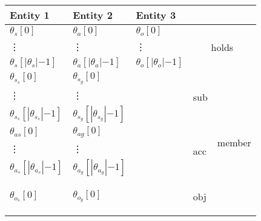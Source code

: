 \documentclass[10pt, twocolumn]{article}
\begin{document}
          \begin{tabular}[t]{|l|l|l|l|l|}
            \hline
            \textbf{Entity 1} &
            \textbf{Entity 2} &
            \textbf{Entity 3} &
            \multicolumn{2}{|l|}{\textbf{}} \\
            \hline
            ${\theta}_{s}[0]$ &
            ${\theta}_{a}[0]$ &
            ${\theta}_{o}[0]$ &
            \multicolumn{2}{|c|}{\multirow{3}{*}{\begin{sideways}holds\end{sideways}}} \\
            \vdots & \vdots & \vdots & \multicolumn{2}{|c|}{} \\
            ${\theta}_{s}[|{\theta}_{s}|{-1}]$ &
            ${\theta}_{a}[|{\theta}_{a}|{-1}]$ &
            ${\theta}_{o}[|{\theta}_{o}|{-1}]$ &
            \multicolumn{2}{|c|}{} \\
            \hline
            ${\theta}_{s_s}[0]$ &
            ${\theta}_{s_g}[0]$ &
            &
            \multirow{3}{*}{\begin{sideways}sub\end{sideways}} &
            \multirow{9}{*}{\begin{sideways}member\end{sideways}} \\
            \vdots & \vdots & & & \\
            ${\theta}_{s_s}[|{\theta}_{s_s}|{-1}]$ & ${\theta}_{s_g}[|{\theta}_{s_g}|{-1}]$ & & & \\
            \cline{1-4}
            ${\theta}_{as}[0]$ &
            ${\theta}_{ag}[0]$ &
            &
            \multirow{3}{*}{\begin{sideways}acc\end{sideways}} & \\
            \vdots & \vdots & & & \\
            ${\theta}_{a_s}[|{\theta}_{a_s}|{-1}]$ & ${\theta}_{a_g}[|{\theta}_{a_g}|{-1}]$ & & & \\
            \cline{1-4}
            ${\theta}_{o_s}[0]$ &
            ${\theta}_{o_g}[0]$ &
            &
            \multirow{3}{*}{\begin{sideways}obj\end{sideways}} & \\

\end{tabular}
\end{document}
